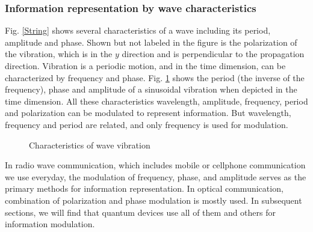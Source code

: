 \documentclass{book}
\begin{document}




\subsubsection{Information representation by wave characteristics}
Fig. \ref{String} shows several characteristics of a wave including its period, amplitude and phase. Shown but not labeled in the figure is the polarization of the vibration, which is in the $y$ direction and is perpendicular to the propagation direction. Vibration is a periodic motion, and in the time dimension, can be characterized by frequency and phase. Fig. \ref{wave} shows the period (the inverse of the frequency), phase and amplitude of a sinusoidal vibration when depicted in the time dimension. All these characteristics wavelength, amplitude, frequency, period and polarization can be modulated to represent information. But wavelength, frequency and period are related, and only frequency is used for modulation.

\begin{figure}[ht]
\caption{Characteristics of wave vibration}
\label{wave}
\end{figure}

In radio wave communication, which includes mobile or cellphone communication we use everyday, the modulation of frequency, phase, and amplitude serves as the primary methods for information representation. In optical communication, combination of polarization and phase modulation is mostly used. In subsequent sections, we will find that quantum devices use all of them and others for information modulation.
\end{document}
